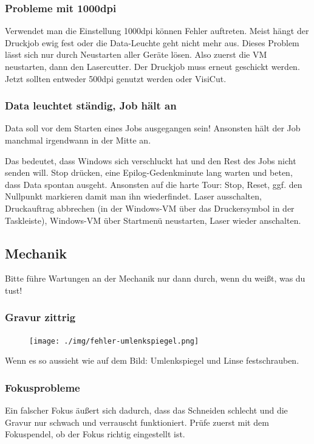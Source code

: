 \documentclass{\basedir/fablab-document}
\begin{document}
	\subsubsection{Probleme mit 1000dpi}
	Verwendet man die Einstellung 1000dpi können Fehler auftreten. Meist hängt der Druckjob ewig fest oder die Data-Leuchte geht nicht mehr aus. Dieses Problem lässt sich nur durch Neustarten aller Geräte lösen. Also zuerst die VM neustarten, dann den Lasercutter. Der Druckjob muss erneut geschickt werden. Jetzt sollten entweder 500dpi genutzt werden oder VisiCut.
	
	\subsubsection{Data leuchtet ständig, Job hält an}
	Data soll vor dem Starten eines Jobs ausgegangen sein! Ansonsten hält der Job manchmal irgendwann in der Mitte an.
	
	Das bedeutet, dass Windows sich verschluckt hat und den Rest des Jobs nicht senden will. Stop drücken, eine Epilog-Gedenkminute lang warten und beten, dass Data spontan ausgeht. Ansonsten auf die harte Tour: Stop, Reset, ggf. den Nullpunkt markieren damit man ihn wiederfindet. Laser ausschalten, Druckauftrag abbrechen (in der Windows-VM über das Druckersymbol in der Taskleiste), Windows-VM über Startmenü neustarten, Laser wieder anschalten.
	
	\subsection{Mechanik}
	Bitte führe Wartungen an der Mechanik nur dann durch, wenn du weißt, was du tust!
	
	\subsubsection{Gravur zittrig}
	\begin{figure}
		\vspace{-50pt} %
		\texttt{[image: ./img/fehler-umlenkspiegel.png]}
		\vspace{-20pt} %
	\end{figure}
	Wenn es so aussieht wie auf dem Bild: Umlenkspiegel und Linse festschrauben.
	
	\subsubsection{Fokusprobleme}
	Ein falscher Fokus äußert sich dadurch, dass das Schneiden schlecht und die Gravur nur schwach und verrauscht funktioniert. Prüfe zuerst mit dem Fokuspendel, ob der Fokus richtig eingestellt ist.
	
\end{document}

